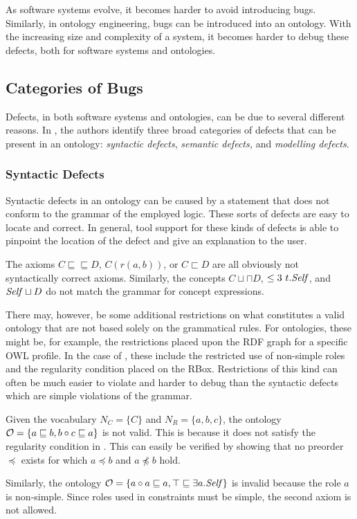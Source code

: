 
As software systems evolve, it becomes harder to avoid introducing bugs. Similarly, in ontology engineering, bugs can be introduced into an ontology. With the increasing size and complexity of a system, it becomes harder to debug these defects, both for software systems and ontologies.

\subsection{Categories of Bugs} \label{categories-of-bugs}

Defects, in both software systems and ontologies, can be due to several different reasons. In \cite{kalyanpur2005debugging}, the authors identify three broad categories of defects that can be present in an ontology: \emph{syntactic defects}, \emph{semantic defects,} and \emph{modelling defects}.

\subsubsection{Syntactic Defects} \label{syntactic-defects}

Syntactic defects in an ontology can be caused by a statement that does not conform to the grammar of the employed logic. These sorts of defects are easy to locate and correct. In general, tool support for these kinds of defects is able to pinpoint the location of the defect and give an explanation to the user.

\begin{example}
  The axioms $C \sqsubseteq \sqsubseteq D$, $C(r(a, b))$, or $C \sqsubset D$ are all obviously not syntactically correct \SROIQ axioms. Similarly, the concepts $C \sqcup \sqcap D$, $\leq 3~t.\mathit{Self}$, and $\mathit{Self} \sqcup D$ do not match the grammar for concept expressions.
\end{example}

There may, however, be some additional restrictions on what constitutes a valid ontology that are not based solely on the grammatical rules. For ontologies, these might be, for example, the restrictions placed upon the RDF graph for a specific OWL profile. In the case of \SROIQ, these include the restricted use of non-simple roles and the regularity condition placed on the RBox. Restrictions of this kind can often be much easier to violate and harder to debug than the syntactic defects which are simple violations of the grammar.

\begin{example}
  Given the vocabulary $N_C = \{ C \}$ and $N_R = \{ a, b, c \}$, the \SROIQ ontology $\mathcal{O} = \{ a \sqsubseteq b, b \circ c \sqsubseteq a \}$ is not valid. This is because it does not satisfy the regularity condition in \SROIQ. This can easily be verified by showing that no preorder $\preceq$ exists for which $a \preceq b$ and $a \not\preceq b$ hold.

  Similarly, the ontology $\mathcal{O} = \{ a \circ a \sqsubseteq a, \top \sqsubseteq \exists a.\mathit{Self} \}$ is invalid because the role $a$ is non-simple. Since roles used in \self constraints must be simple, the second axiom is not allowed.
\end{example}


